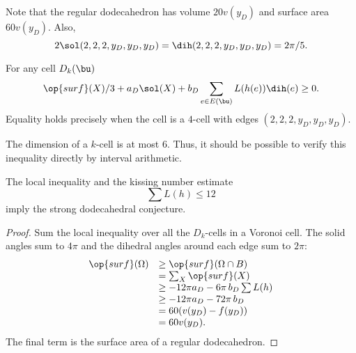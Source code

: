 Note that the regular dodecahedron has volume $20 v(y_D)$ and surface
area $60 v(y_D)$.  Also,
\begin{displaymath}
2\sol(2,2,2,y_D,y_D,y_D) =\dih(2,2,2,y_D,y_D,y_D)=2\pi/5.
\end{displaymath}
%
%

\begin{assertion}  For any cell $D_k(\bu)$
\begin{displaymath}
\op{surf}(X)/3 + a_D \sol(X) + b_D \sum_{e\in E(\bu)} L(h(e)) \dih(e) \ge 0.
\end{displaymath}
Equality  holds precisely when the cell is a $4$-cell with edges
$(2,2,2,y_D,y_D,y_D)$.
\end{assertion}
%

\begin{note} %
  The dimension of a $k$-cell is at most $6$.  Thus, it should be
  possible to verify this inequality directly by interval arithmetic.
\end{note}

\begin{lemma}[]
  The local inequality and the kissing number estimate
\begin{displaymath}
\sum L(h) \le 12
\end{displaymath}
imply the strong dodecahedral conjecture.
\end{lemma}

\begin{proof} 
  Sum the local inequality over all the $D_k$-cells in a Voronoi cell.
  The solid angles sum to $4\pi$ and the dihedral angles around each
  edge sum to $2\pi$:
\begin{displaymath}
\begin{array}{lll}
\op{surf}(\Omega) &\ge \op{surf}(\Omega\cap B)\\
&=\sum_X \op{surf}(X)\\
&\ge -12\pi a_D - 6\pi\, b_D  \sum L(h)\\
&\ge -12\pi a_D - 72\pi\, b_D\\
&= 60 (v(y_D) - f(y_D))\\
&= 60 v(y_D).\\
\end{array}
\end{displaymath}
The final term is the surface area of a regular dodecahedron.
\end{proof}

